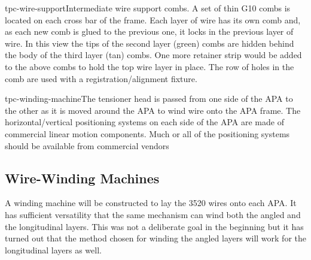 \begin{cdrfigure}{tpc-wire-support}{Intermediate wire support combs.  A set of thin G10 combs is located on each cross bar of the frame.  Each layer of wire has its own comb and, as each new comb is glued to the previous one, it locks in the previous layer of wire.  In this view the tips of the second layer (green) combs are hidden behind the body of the third layer (tan) combs.  One more retainer strip would be added to the above combs to hold the top wire layer in place.  The row of holes in the comb are used with a registration/alignment fixture.}
\end{cdrfigure}


\begin{cdrfigure}{tpc-winding-machine}{The tensioner head is passed from one side of the APA to the other as it is moved around the APA to wind wire onto the APA frame.  The horizontal/vertical positioning systems on each side of the APA are made of commercial linear motion components.  Much or all of the positioning systems should be available from commercial vendors}
\end{cdrfigure}


\subsection{Wire-Winding Machines}
\label{subsec:fd-ref-wirewinding}

A winding machine will be constructed to lay the 3520 wires onto each APA. It has sufficient versatility that the same mechanism can wind both the angled and the longitudinal layers.  This was not a deliberate goal in the beginning but it has turned out that the method chosen for winding the angled layers will work for the longitudinal layers as well.
 
